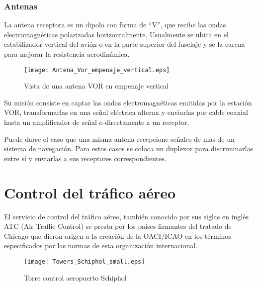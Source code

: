 \subsubsection*{Antenas}
\label{Antenas}

La antena receptora es un dipolo con forma de ``V'', que recibe las ondas electromagnéticas polarizadas horizontalmente. Usualmente se ubica en el estabilizador vertical del avión o en la parte superior del fuselaje y se la carena para mejorar la resistencia aerodinámica.

\begin{wrapfigure}{r}{60mm}
 \begin{center}
 \texttt{[image: Antena\_Vor\_empenaje\_vertical.eps]}
\end{center}

\caption{Vista de una antena VOR en empenaje vertical}
\end{wrapfigure} 

Su misión consiste en captar las ondas electromagnéticas emitidas por la estación VOR, transformarlas en una señal eléctrica alterna y enviarlas por cable coaxial hasta un amplificador de señal o directamente a un receptor.

Puede darse el caso que una misma antena recepcione señales de más de un sistema de navegación. Para estos casos se coloca un duplexor para discriminarlas entre sí y enviarlas a sus receptores correspondientes.





\section*{Control del tráfico aéreo}
\label{Control_del_trafico_aereo}

El servicio de control del tráfico aéreo, también conocido por sus siglas en inglés ATC (Air Traffic Control) se presta por los países firmantes del tratado de Chicago que dieron origen a la creación de la OACI/ICAO en los términos especificados por las normas de esta organización internacional.

\begin{wrapfigure}{r}{60mm}
 \begin{center}
 \texttt{[image: Towers\_Schiphol\_small.eps]}
\end{center}
	\label{Towers_Schiphol_small}
	\caption{Torre control aeropuerto Schiphol}
\end{wrapfigure}

